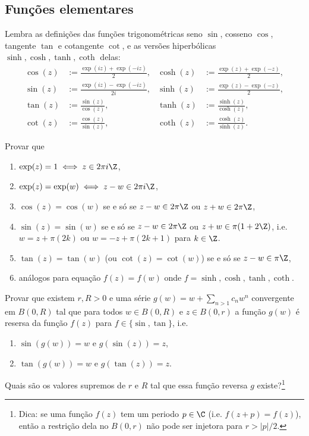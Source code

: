 \subsection{Funções elementares}

Lembra as definições das funções trigonométricas seno $\sin$, cosseno $\cos$,
tangente $\tan$ e cotangente $\cot$,
e as versões hiperbólicas $\sinh, \cosh, \tanh, \coth$ delas:
\begin{align*}
\cos(z) &:= \frac{\exp(iz) + \exp(-iz)}{2}, &
\cosh(z) &:= \frac{\exp(z) + \exp(-z)}{2}, \\
\sin(z) &:= \frac{\exp(iz) - \exp(-iz)}{2i}, &
\sinh(z) &:= \frac{\exp(z) - \exp(-z)}{2}, \\
\tan(z) &:= \frac{\sin(z)}{\cos(z)}, &
\tanh(z) &:= \frac{\sinh(z)}{\cosh(z)}, \\
\cot(z) &:= \frac{\cos(z)}{\sin(z)}, &
\coth(z) &:= \frac{\cosh(z)}{\sinh(z)}.
\end{align*}

\begin{problema}
Provar que
\begin{enumerate}
\item $\exp(z) = 1 \iff z\in 2\pi i\Z$,
\item $\exp(z) = \exp(w) \iff z-w \in 2\pi i\Z$,
\item $\cos(z) = \cos(w)$ se e só se $z-w \in 2\pi\Z$ ou $z+w \in 2\pi\Z$,
\item $\sin(z) = \sin(w)$ se e só se $z-w \in 2\pi\Z$ ou $z+w \in \pi(1+2\Z)$,
i.e. $w=z+\pi (2k)$ ou $w = -z+\pi(2k+1)$ para $k\in\Z$.
\item $\tan(z) = \tan(w)$ (ou $\cot(z) = \cot(w)$)
se e só se $z-w\in\pi\Z$,
\item análogos para equação $f(z) = f(w)$ onde $f = \sinh, \cosh, \tanh, \coth$.
\end{enumerate}
\end{problema}

\begin{problema}
Provar que existem $r,R>0$ e uma série $g(w) = w + \sum_{n>1} c_n w^n$ convergente em $B(0,R)$
tal que para todos $w\in B(0,R)$ e $z\in B(0,r)$ a função $g(w)$ é resersa da função $f(z)$
para $f\in \{\sin,\tan\}$, i.e.
\begin{enumerate}
\item $\sin(g(w)) = w$ e $g(\sin(z)) = z$,
\item $\tan(g(w)) = w$ e $g(\tan(z)) = z$.
\end{enumerate}
Quais são os valores supremos de $r$ e $R$ tal que essa função reversa $g$ existe?\footnote{Dica:
se uma função $f(z)$ tem um periodo $p\in\C$ (i.e. $f(z+p)=f(z)$),
então a restrição dela no $B(0,r)$
não pode ser injetora para $r>|p|/2$.}
\end{problema}

